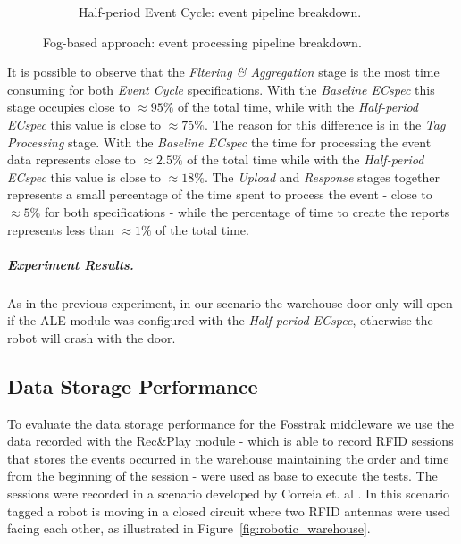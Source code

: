 \begin{figure}[ht!]
\begin{subfigure}{.5\textwidth}
            \caption{Half-period Event Cycle: event pipeline breakdown.}
            \label{fig:ecspec_effective_half}
          \end{subfigure}
          \caption[Fog deployment: event processing breakdown.]{Fog-based approach: event processing pipeline breakdown.}
          \label{fig:ecspec_effective_breakdown}
        \end{figure}

        It is possible to observe that the \textit{Fltering \& Aggregation} stage is the most time consuming
        for both \textit{Event Cycle} specifications. With the \textit{Baseline ECspec} this stage occupies
        close to $\approx95\%$ of the total time, while with the \textit{Half-period ECspec} this value is
        close to $\approx75\%$. The reason for this difference is in the \textit{Tag Processing} stage.
        With the \textit{Baseline ECspec} the time for processing the event data represents close to $\approx2.5\%$
        of the total time while with the \textit{Half-period ECspec} this value is close to $\approx18\%$.
        The \textit{Upload} and \textit{Response} stages together represents a small percentage of
        the time spent to process the event - close to $\approx5\%$ for both specifications - while the percentage
        of time to create the reports represents less than $\approx1\%$ of the total time.

        \subparagraph{Experiment Results.}
        \label{subp:fog_experiment_result}
        As in the previous experiment, in our scenario the warehouse door only will open if the \gls{ALE}
        module was configured with the \textit{Half-period ECspec}, otherwise the robot will crash with
        the door.

        \subsection{Data Storage Performance}
        \label{sub:eval_exp_data}
        To evaluate the data storage performance for the Fosstrak middleware we use the data recorded with the Rec\&Play
        module - which is able to record \gls{RFID} sessions that stores the events occurred in the warehouse
        maintaining the order and time from the beginning of the session - were used as base to execute
        the tests. The sessions were recorded in a scenario developed by Correia et. al \cite{Correia:Thesis:2014}.
        In this scenario tagged a robot is moving in a closed circuit where two \gls{RFID} antennas were used
        facing each other, as illustrated in Figure~\ref{fig:robotic_warehouse}.\\

